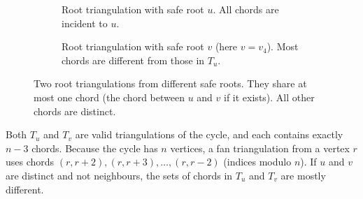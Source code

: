 \begin{figure}[htbp]
    \centering
    \begin{subfigure}{0.45\textwidth}
        \centering
        \caption{Root triangulation with safe root \(u\). All chords are incident to \(u\).}
        \label{fig:Tu}
    \end{subfigure}
    \hfill
    \begin{subfigure}{0.45\textwidth}
        \centering
        \caption{Root triangulation with safe root \(v\) (here \(v = v_4\)). Most chords are different from those in \(T_u\).}
        \label{fig:Tv}
    \end{subfigure}
    \caption{Two root triangulations from different safe roots. They share at most one chord (the chord between \(u\) and \(v\) if it exists). All other chords are distinct.}
    \label{fig:two_roots}
\end{figure}

Both \(T_u\) and \(T_v\) are valid triangulations of the cycle, and each contains exactly \(n-3\) chords. 
Because the cycle has \(n\) vertices, a fan triangulation from a vertex \(r\) uses chords \((r, r+2), (r, r+3), \dots, (r, r-2)\) (indices modulo \(n\)). 
If \(u\) and \(v\) are distinct and not neighbours, the sets of chords in \(T_u\) and \(T_v\) are mostly different.

